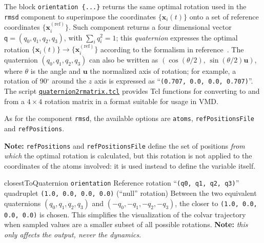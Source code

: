 The block \texttt{orientation~\{...\}} returns the
same optimal rotation used in the \texttt{rmsd} component to
superimpose the coordinates $\{\mathbf{x}_{i}(t)\}$ onto a set of
reference coordinates $\{\mathbf{x}_{i}^{\mathrm{(ref)}}\}$.  Such
component returns a four dimensional vector $\mathsf{q} = (q_0, q_1,
q_2, q_3)$, with $\sum_{i} q_{i}^{2} = 1$; this \emph{quaternion}
expresses the optimal rotation $\{\mathbf{x}_{i}(t)\} \rightarrow
\{\mathbf{x}_{i}^{\mathrm{(ref)}}\}$ according to the formalism in
reference~\cite{Coutsias2004}.  The quaternion $(q_0, q_1, q_2, q_3)$
can also be written as $\left(\cos(\theta/2), \,
  \sin(\theta/2)\mathbf{u}\right)$, where $\theta$ is the angle and
$\mathbf{u}$ the normalized axis of rotation; for example, a rotation
of 90$^{\circ}$ around the $z$ axis is expressed as
``\texttt{(0.707, 0.0, 0.0, 0.707)}''.  The script
\href{https://raw.githubusercontent.com/Colvars/colvars/master/colvartools/quaternion2rmatrix.tcl}{\texttt{quaternion2rmatrix.tcl}} provides Tcl functions for converting
to and from a $4\times{}4$ rotation matrix in a format suitable for
usage in VMD.

As for the component \texttt{rmsd}, the available options are \texttt{atoms}, \texttt{refPositionsFile} and \texttt{refPositions}.

\textbf{Note:} \texttt{refPositions} and \texttt{refPositionsFile} define the set of positions \emph{from which} the optimal rotation is calculated, but this rotation is not applied to the coordinates of the atoms involved: it is used instead to define the variable itself.

\begin{cvcoptions}
\item %
\item %
\item %


\item %
  \keydef
    {closestToQuaternion}{%
    \texttt{orientation}}{%
    Reference rotation}{%
    ``\texttt{(q0, q1, q2, q3)}'' quadruplet}{%
    \texttt{(1.0, 0.0, 0.0, 0.0)} (``null'' rotation)}{%
    Between the two equivalent quaternions $(q_0, q_1, q_2, q_3)$ and
    $(-q_0, -q_1, -q_2, -q_3)$, the closer to \texttt{(1.0, 0.0, 0.0,
      0.0)} is chosen.  This simplifies the visualization of the
    colvar trajectory when sampled values are a smaller subset of all
    possible rotations.  \textbf{Note:} \emph {this only affects the
      output, never the dynamics}.}

\end{cvcoptions}



